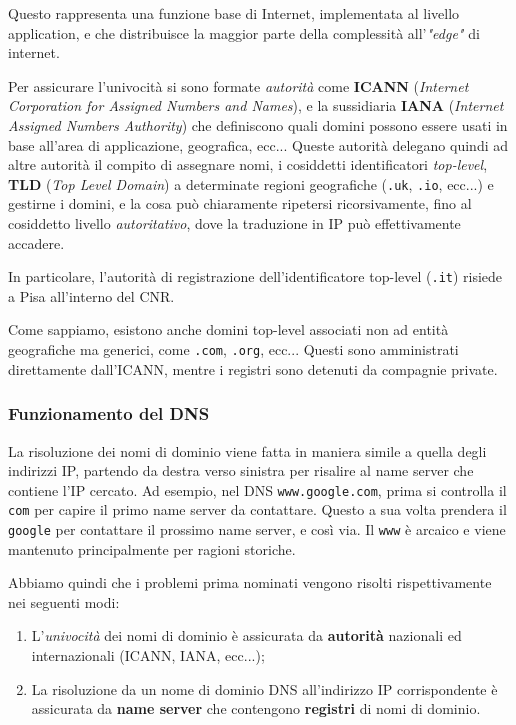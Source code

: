 \documentclass[a4paper,11pt]{article}
\begin{document}
Questo rappresenta una funzione base di Internet, implementata al livello application, e che distribuisce la maggior parte della complessità all'\textit{"edge"} di internet.

Per assicurare l'univocità si sono formate \textit{autorità} come \textbf{ICANN} (\textit{Internet Corporation for Assigned Numbers and Names}), e la sussidiaria \textbf{IANA} (\textit{Internet Assigned Numbers Authority}) che definiscono quali domini possono essere usati in base all'area di applicazione, geografica, ecc...
Queste autorità delegano quindi ad altre autorità il compito di assegnare nomi, i cosiddetti identificatori \textit{top-level}, \textbf{TLD} (\textit{Top Level Domain}) a determinate regioni geografiche (\lstinline|.uk|, \lstinline|.io|, ecc...) e gestirne i domini, e la cosa può chiaramente ripetersi ricorsivamente, fino al cosiddetto livello \textit{autoritativo}, dove la traduzione in IP può effettivamente accadere.

In particolare, l'autorità di registrazione dell'identificatore top-level (\lstinline|.it|) risiede a Pisa all'interno del CNR. 

Come sappiamo, esistono anche domini top-level associati non ad entità geografiche ma generici, come \lstinline|.com|, \lstinline|.org|, ecc...
Questi sono amministrati direttamente dall'ICANN, mentre i registri sono detenuti da compagnie private.

\subsubsection{Funzionamento del DNS}

La risoluzione dei nomi di dominio viene fatta in maniera simile a quella degli indirizzi IP, partendo da destra verso sinistra per risalire al name server che contiene l'IP cercato.
Ad esempio, nel DNS \lstinline|www.google.com|, prima si controlla il \lstinline|com| per capire il primo name server da contattare. Questo a sua volta prendera il \lstinline|google| per contattare il prossimo name server, e così via.
Il \lstinline|www| è arcaico e viene mantenuto principalmente per ragioni storiche.

Abbiamo quindi che i problemi prima nominati vengono risolti rispettivamente nei seguenti modi:
\begin{enumerate}
	\item L'\textit{univocità} dei nomi di dominio è assicurata da \textbf{autorità} nazionali ed internazionali (ICANN, IANA, ecc...);
	\item La risoluzione da un nome di dominio DNS all'indirizzo IP corrispondente è assicurata da \textbf{name server} che contengono \textbf{registri} di nomi di dominio.
\end{enumerate}
\end{document}
